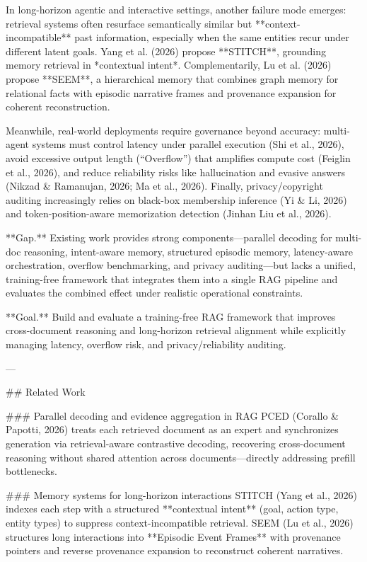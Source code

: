 In long-horizon agentic and interactive settings, another failure mode emerges: retrieval systems often resurface semantically similar but **context-incompatible** past information, especially when the same entities recur under different latent goals. Yang et al. (2026) propose **STITCH**, grounding memory retrieval in *contextual intent*. Complementarily, Lu et al. (2026) propose **SEEM**, a hierarchical memory that combines graph memory for relational facts with episodic narrative frames and provenance expansion for coherent reconstruction.

Meanwhile, real-world deployments require governance beyond accuracy: multi-agent systems must control latency under parallel execution (Shi et al., 2026), avoid excessive output length (“Overflow”) that amplifies compute cost (Feiglin et al., 2026), and reduce reliability risks like hallucination and evasive answers (Nikzad & Ramanujan, 2026; Ma et al., 2026). Finally, privacy/copyright auditing increasingly relies on black-box membership inference (Yi & Li, 2026) and token-position-aware memorization detection (Jinhan Liu et al., 2026).

**Gap.** Existing work provides strong components—parallel decoding for multi-doc reasoning, intent-aware memory, structured episodic memory, latency-aware orchestration, overflow benchmarking, and privacy auditing—but lacks a unified, training-free framework that integrates them into a single RAG pipeline and evaluates the combined effect under realistic operational constraints.

**Goal.** Build and evaluate a training-free RAG framework that improves cross-document reasoning and long-horizon retrieval alignment while explicitly managing latency, overflow risk, and privacy/reliability auditing.

---

## Related Work  

### Parallel decoding and evidence aggregation in RAG  
PCED (Corallo & Papotti, 2026) treats each retrieved document as an expert and synchronizes generation via retrieval-aware contrastive decoding, recovering cross-document reasoning without shared attention across documents—directly addressing prefill bottlenecks.

### Memory systems for long-horizon interactions  
STITCH (Yang et al., 2026) indexes each step with a structured **contextual intent** (goal, action type, entity types) to suppress context-incompatible retrieval. SEEM (Lu et al., 2026) structures long interactions into **Episodic Event Frames** with provenance pointers and reverse provenance expansion to reconstruct coherent narratives.


